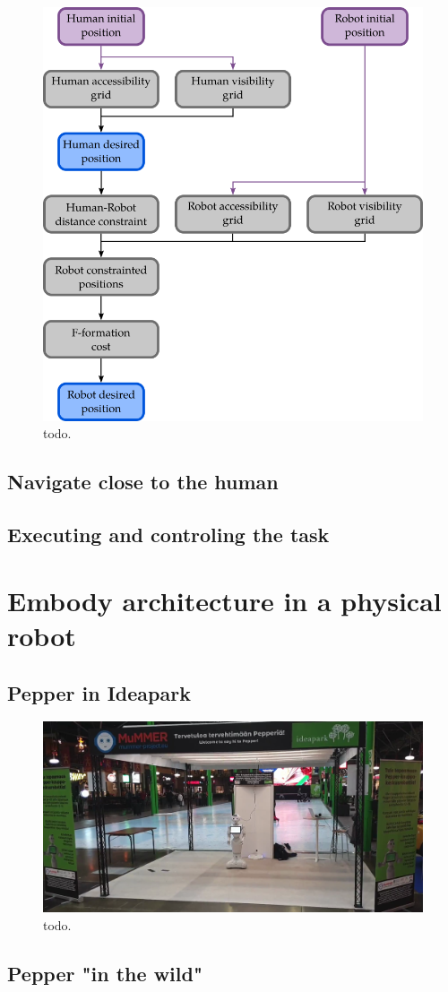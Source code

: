 \begin{figure}[ht!]
\centering
\includegraphics[scale=0.45]{figures/chapter8/svp.png}
\caption{\label{fig:chap8_svp} todo. }
\end{figure}

\subsection{Navigate close to the human}

\subsection{Executing and controling the task}

\section{Embody architecture in a physical robot}

\subsection{Pepper in Ideapark}

\begin{figure}[ht!]
\centering
\includegraphics[scale=0.15]{figures/chapter8/pepper_mall.png}
\caption{\label{fig:chap8_pepper_mall} todo. }
\end{figure}

\subsection{Pepper "in the wild"}